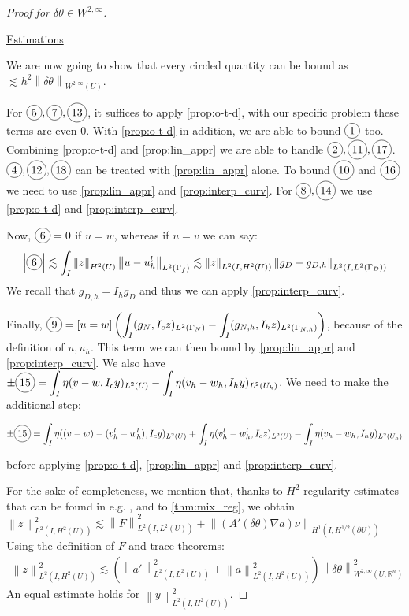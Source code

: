 \documentclass[english,a4paper,10pt,oneside]{scrbook}	%
\theoremstyle{break}
\newenvironment{mproof}[1][\proofname]{%
  \begin{proof}[#1]$ $\par\nobreak\ignorespaces
}{%
  \end{proof}
}
\renewcommand*{\proofname}{Proof}
\theoremstyle{remark}
\newcommand{\mR}{\mathbb{R}}
\newcommand{\ds}{\displaystyle}
\newcommand{\norm}[1]{\left\lVert#1\right\rVert}
\newcommand{\te}{\theta}
\newcommand*\circled[1]{\tikz[baseline=(char.base)]{
            \node[shape=circle,draw,inner sep=2pt] (char) {#1};}}
\begin{document}
\begin{mproof}[Proof for $\delta \te \in W^{2,\infty}$]
\underline{Estimations}

We are now going to show that every circled quantity can be bound as $\lesssim h^2 \norm{\delta \te}_{W^{2,\infty}(U)}$.

For $\circled{5},\circled{7},\circled{13}$, it suffices to apply \cref{prop:o-t-d}, with our specific problem these terms are even $0$. With  \cref{prop:o-t-d} in addition, we are able to bound $\circled{1}$ too. Combining \cref{prop:o-t-d} and \cref{prop:lin_appr} we are able to handle $ \circled{2}, \circled{11}, \circled{17}$. $\circled{4}, \circled{12}, \circled{18}$ can be treated with \cref{prop:lin_appr} alone. To bound $\circled{10} $ and $\circled{16}$ we need to use  \cref{prop:lin_appr} and \cref{prop:interp_curv}. For $\circled{8}, \circled{14}$ we use \cref{prop:o-t-d} and \cref{prop:interp_curv}.

Now, $\circled{6}=0$ if $u=w$, whereas if $u=v$ we can say:
\begin{align*}
\left | \circled{6} \right |\ds \lesssim \int_I \norm{z}_{H^2(U)}\norm{u-u_h^l}_{L^2(\Gamma_f)}\lesssim \norm{z}_{L^2(I,H^2(U))}\norm{g_D -g_{D,h}}_{L^2(I,L^2(\Gamma_D))} 
\end{align*}
We recall that $g_{D,h} = I_h g_D$ and thus we can apply \cref{prop:interp_curv}.

Finally, $\circled{9} = \ds \left [ u  = w \right ] \left ( \int_I (g_N,I_cz)_{L^2(\Gamma_N)}- \int_I (g_{N,h},I_hz)_{L^2(\Gamma_{N,h})} \right )$, because of the definition of $u, u_h$. This term we can then bound by  \cref{prop:lin_appr} and \cref{prop:interp_curv}. We also have $\ds \pm \circled{15} = \int_I \eta (v-w,I_c y)_{L^2(U)} - \int_I \eta (v_h-w_h,I_h y)_{L^2(U_h)}$. We need to make the additional step:

\begin{align*}
\pm \circled{15} = \int_I\eta((v-w)-(v_h^l-w_h^l),I_cy)_{L^2(U)} + \int_I\eta(v_h^l-w_h^l,I_c z)_{L^2(U)} - \int_I \eta (v_h-w_h,I_h y)_{L^2(U_h)}
\end{align*}  

before applying \cref{prop:o-t-d}, \cref{prop:lin_appr} and  \cref{prop:interp_curv}.

For the sake of completeness, we mention that, thanks to $H^2$ regularity estimates that can be found in e.g. \cite{grisvard}, and to \cref{thm:mix_reg}, we obtain $\norm{z}_{L^2(I,H^2(U))}^2 \lesssim \norm{F}_{L^2(I,L^2(U))}^2 + \norm{(A'(\delta \te)\nabla a )\nu}_{H^1(I,H^{1/2}(\partial U))}$
Using the definition of $F$ and trace theorems:
\begin{align*}
\norm{z}_{L^2(I,H^2(U))}^2 \lesssim (\norm{a'}_{L^2(I,L^2(U))}^2 + \norm{a}_{L^2(I,H^2(U))}^2)\norm{\delta \te}_{W^{2,\infty}(U;\mR^n)}^2
\end{align*}
An equal estimate holds for $\norm{y}_{L^2(I,H^2(U))}^2 $.
\end{mproof}
\end{document}
